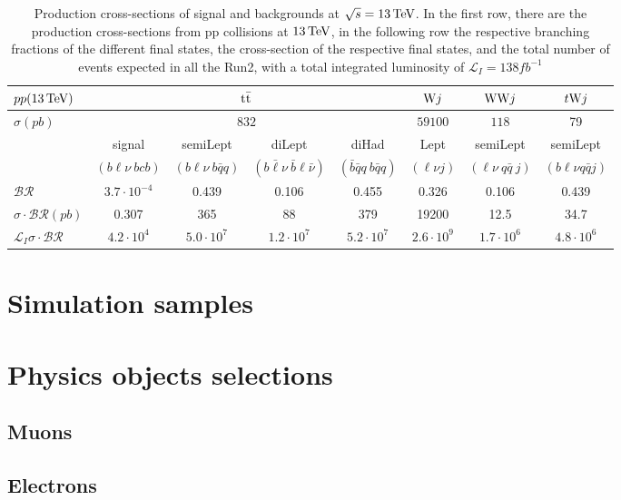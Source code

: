 \begin{table}[H]
    \centering
    \begin{tabular}{l|cccc|c|c|c}
          $pp (13{\,\text{Te\hspace{-.08em}V}})$&\multicolumn{4}{c|}{$ {{\text{t}}{\bar{\text{t}}}}$}&  $ {\text{W}} j$& $ {\text{W}} {\text{W}} j$ & $ t{\text{W}} j$\\
          \hline
          $\sigma(pb)$&\multicolumn{4}{c|}{$832$}& $59100$ & $118$ &  79  \\
          \hline
          &signal&  semiLept&  diLept&  diHad& Lept &  semiLept & semiLept\\
          &$(b\ell \nu\: bcb)$&$(b\ell \nu\: b\bar{q}q)$&$(b\bar{\ell} \nu\: \bar{b}\ell \bar{\nu})$&$(\bar{b}\bar{q}q\: b\bar{q}q)$&$(\ell \nu j)$&$(\ell \nu \: q\bar{q} \: j)$& $(b\ell\nu q \bar{q} j)$\\
          \hline
          $\mathcal{BR}$& $3.7 \cdot 10^{-4}$   & 0.439 & 0.106 & 0.455 & 0.326 & 0.106 & 0.439 \\
          $\sigma \cdot \mathcal{BR} (pb)$& 0.307 & 365 & 88 & 379 & 19200 & 12.5 & 34.7 \\
          $\mathcal{L}_I\sigma \cdot\mathcal{BR}$&$4.2 \cdot 10^4$& $5.0 \cdot 10^7$ &  $1.2 \cdot 10^7$&$5.2 \cdot 10^7$  &  $2.6 \cdot 10^9$ & $1.7 \cdot 10^6$  & $4.8 \cdot 10^6$  
    \end{tabular}
    \vspace{0.2cm}
    \caption{Production cross-sections of signal and backgrounds at $\sqrt{s}=13{\,\text{Te\hspace{-.08em}V}}$. In the first row, there are the production cross-sections from pp collisions at $13 {\,\text{Te\hspace{-.08em}V}}$, in the following row the respective branching fractions of the different final states, the cross-section of the respective final states, and the total number of events expected in all the Run2, with a total integrated luminosity of $\mathcal{L}_I=138 {fb}^{-1}$}
    \label{tab:cross}
\end{table}

\section{Simulation samples}
\section{Physics objects selections}
\subsection{Muons}
\subsection{Electrons}
